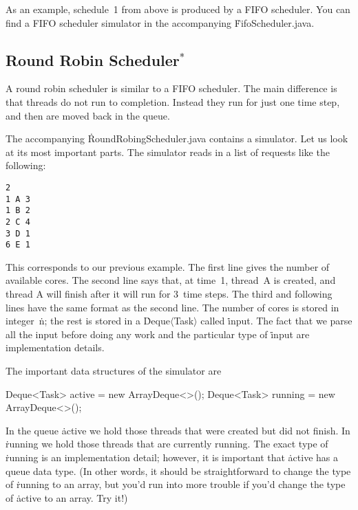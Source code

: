 As an example, schedule~1 from above is produced by a FIFO scheduler.
You can find a FIFO scheduler simulator in the accompanying \.{FifoScheduler.java}.


\subsection*{Round Robin Scheduler${}^\ast$}

A round robin scheduler is similar to a FIFO scheduler.
The main difference is that threads do not run to completion.
Instead they run for just one time step, and then are moved back in the queue.

The accompanying \.{RoundRobingScheduler.java} contains a simulator.
Let us look at its most important parts.
The simulator reads in a list of requests like the following:
\begin{verbatim}
2
1 A 3
1 B 2
2 C 4
3 D 1
6 E 1
\end{verbatim}
This corresponds to our previous example.
The first line gives the number of available cores.
The second line says that, at time~1, thread~A is created,
  and thread A will finish after it will run for 3~time steps.
The third and following lines have the same format as the second line.
The number of cores is stored in integer~\.{n};
  the rest is stored in a \.{Deque$\langle$Task$\rangle$} called \.{input}.
The fact that we parse all the input before doing any work
  and the particular type of \.{input} are implementation details.

The important data structures of the simulator are
\begin{ccode}
Deque<Task> active = new ArrayDeque<>();
Deque<Task> running = new ArrayDeque<>();
\end{ccode}
In the queue \.{active} we hold those threads that were created but did not finish.
In \.{running} we hold those threads that are currently running.
The exact type of \.{running} is an implementation detail;
  however, it is important that \.{active} has a queue data type.
(In other words,
  it should be straightforward to change the type of \.{running} to an array,
  but you'd run into more trouble if you'd change the type of \.{active} to an array.
Try it!)

